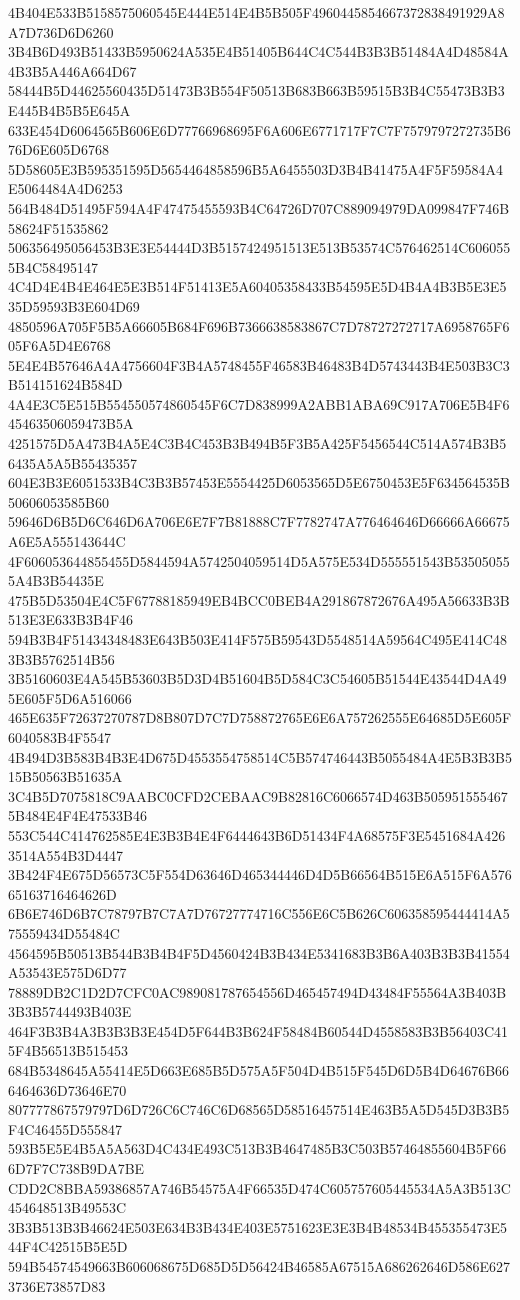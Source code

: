 {{{{{{{{{{{{{{{{{{{{{4B404E533B5158575060545E444E514E4B5B505F4960445854667372838491929A8A7D736D6D6260
3B4B6D493B51433B5950624A535E4B51405B644C4C544B3B3B51484A4D48584A4B3B5A446A664D67
58444B5D44625560435D51473B3B554F50513B683B663B59515B3B4C55473B3B3E445B4B5B5E645A
633E454D6064565B606E6D77766968695F6A606E6771717F7C7F7579797272735B676D6E605D6768
5D58605E3B595351595D5654464858596B5A6455503D3B4B41475A4F5F59584A4E5064484A4D6253
564B484D51495F594A4F47475455593B4C64726D707C889094979DA099847F746B58624F51535862
506356495056453B3E3E54444D3B5157424951513E513B53574C576462514C6060555B4C58495147
4C4D4E4B4E464E5E3B514F51413E5A60405358433B54595E5D4B4A4B3B5E3E535D59593B3E604D69
4850596A705F5B5A66605B684F696B7366638583867C7D78727272717A6958765F605F6A5D4E6768
5E4E4B57646A4A4756604F3B4A5748455F46583B46483B4D5743443B4E503B3C3B514151624B584D
4A4E3C5E515B554550574860545F6C7D838999A2ABB1ABA69C917A706E5B4F645463506059473B5A
4251575D5A473B4A5E4C3B4C453B3B494B5F3B5A425F5456544C514A574B3B56435A5A5B55435357
604E3B3E6051533B4C3B3B57453E5554425D6053565D5E6750453E5F634564535B50606053585B60
59646D6B5D6C646D6A706E6E7F7B81888C7F7782747A776464646D66666A66675A6E5A555143644C
4F606053644855455D5844594A5742504059514D5A575E534D555551543B535050555A4B3B54435E
475B5D53504E4C5F67788185949EB4BCC0BEB4A291867872676A495A56633B3B513E3E633B3B4F46
594B3B4F51434348483E643B503E414F575B59543D5548514A59564C495E414C483B3B5762514B56
3B5160603E4A545B53603B5D3D4B51604B5D584C3C54605B51544E43544D4A495E605F5D6A516066
465E635F72637270787D8B807D7C7D758872765E6E6A757262555E64685D5E605F6040583B4F5547
4B494D3B583B4B3E4D675D4553554758514C5B574746443B5055484A4E5B3B3B515B50563B51635A
3C4B5D7075818C9AABC0CFD2CEBAAC9B82816C6066574D463B5059515554675B484E4F4E47533B46
553C544C414762585E4E3B3B4E4F6444643B6D51434F4A68575F3E5451684A4263514A554B3D4447
3B424F4E675D56573C5F554D63646D465344446D4D5B66564B515E6A515F6A57665163716464626D
6B6E746D6B7C78797B7C7A7D76727774716C556E6C5B626C606358595444414A575559434D55484C
4564595B50513B544B3B4B4F5D4560424B3B434E5341683B3B6A403B3B3B41554A53543E575D6D77
78889DB2C1D2D7CFC0AC989081787654556D465457494D43484F55564A3B403B3B3B5744493B403E
464F3B3B4A3B3B3B3E454D5F644B3B624F58484B60544D4558583B3B56403C415F4B56513B515453
684B5348645A55414E5D663E685B5D575A5F504D4B515F545D6D5B4D64676B666464636D73646E70
807777867579797D6D726C6C746C6D68565D58516457514E463B5A5D545D3B3B5F4C46455D555847
593B5E5E4B5A5A563D4C434E493C513B3B4647485B3C503B57464855604B5F666D7F7C738B9DA7BE
CDD2C8BBA59386857A746B54575A4F66535D474C605757605445534A5A3B513C454648513B49553C
3B3B513B3B46624E503E634B3B434E403E5751623E3E3B4B48534B455355473E544F4C42515B5E5D
594B54574549663B606068675D685D5D56424B46585A67515A686262646D586E6273736E73857D83
}}}}}}}}}}}}}}}}}}}}}
